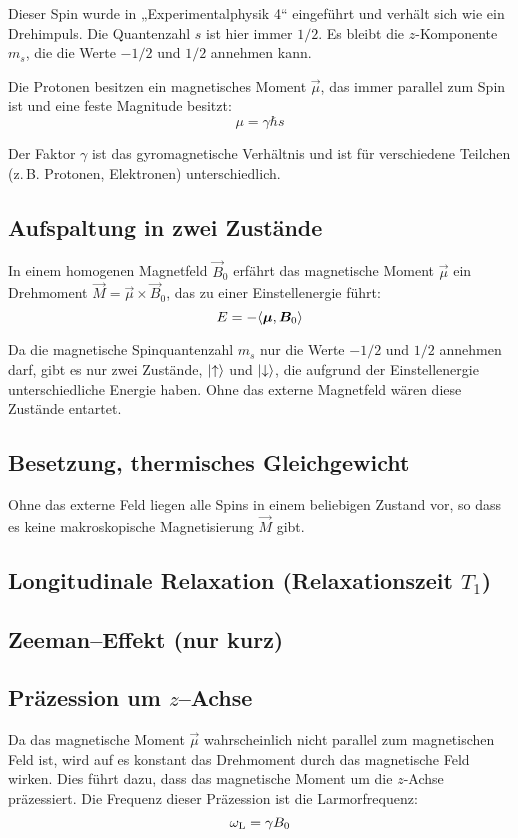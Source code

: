 Dieser Spin wurde in „Experimentalphysik 4“ eingeführt und verhält sich wie ein
Drehimpuls. Die Quantenzahl $s$ ist hier immer $1/2$. Es bleibt die
$z$-Komponente $m_s$, die die Werte $-1/2$ und $1/2$ annehmen kann.

Die Protonen besitzen ein magnetisches Moment $\vec\mu$, das immer parallel zum
Spin ist und eine feste Magnitude besitzt:
\[
    \mu = \gamma \hbar s
\]

Der Faktor $\gamma$ ist das gyromagnetische Verhältnis und ist für verschiedene
Teilchen (z.\,B. Protonen, Elektronen) unterschiedlich.

\subsection{Aufspaltung in zwei Zustände}

In einem homogenen Magnetfeld $\vec B_0$ erfährt das magnetische Moment
$\vec\mu$ ein Drehmoment $\vec M = \vec \mu \times \vec B_0$, das zu einer
Einstellenergie führt:
\[
    E = - \langle \boldsymbol{\mu}, \boldsymbol{B}_0 \rangle
\]

Da die magnetische Spinquantenzahl $m_s$ nur die Werte $-1/2$ und $1/2$ annehmen
darf, gibt es nur zwei Zustände, $\ket\uparrow$ und $\ket\downarrow$, die
aufgrund der Einstellenergie unterschiedliche Energie haben. Ohne das externe
Magnetfeld wären diese Zustände entartet.

\subsection{Besetzung, thermisches Gleichgewicht}

Ohne das externe Feld liegen alle Spins in einem beliebigen Zustand vor, so
dass es keine makroskopische Magnetisierung $\vec M$ gibt.

\subsection{Longitudinale Relaxation (Relaxationszeit $T_1$)}
\subsection{Zeeman–Effekt (nur kurz)}
\subsection{Präzession um $z$–Achse}

Da das magnetische Moment $\vec\mu$ wahrscheinlich nicht parallel zum
magnetischen Feld ist, wird auf es konstant das Drehmoment durch das
magnetische Feld wirken. Dies führt dazu, dass das magnetische Moment um die
$z$-Achse präzessiert. Die Frequenz dieser Präzession ist die Larmorfrequenz:
\[
    \omega_\text L = \gamma B_0
\]

